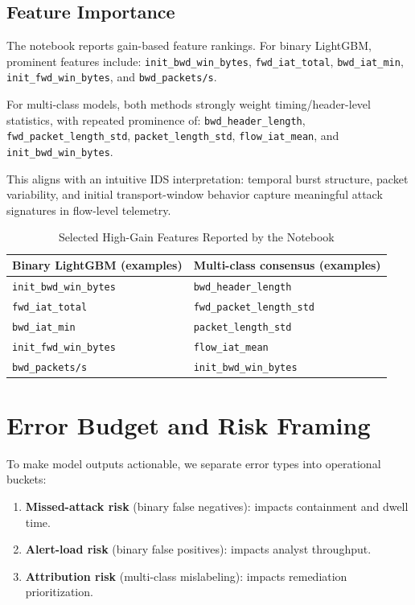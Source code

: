 \documentclass[10pt,journal]{IEEEtran}
\begin{document}
\subsection{Feature Importance}
The notebook reports gain-based feature rankings. For binary LightGBM, prominent features include:
\texttt{init\_bwd\_win\_bytes}, \texttt{fwd\_iat\_total}, \texttt{bwd\_iat\_min}, \texttt{init\_fwd\_win\_bytes}, and \texttt{bwd\_packets/s}. 

For multi-class models, both methods strongly weight timing/header-level statistics, with repeated prominence of:
\texttt{bwd\_header\_length}, \texttt{fwd\_packet\_length\_std}, \texttt{packet\_length\_std}, \texttt{flow\_iat\_mean}, and \texttt{init\_bwd\_win\_bytes}.

This aligns with an intuitive IDS interpretation: temporal burst structure, packet variability, and initial transport-window behavior capture meaningful attack signatures in flow-level telemetry.

\begin{table}[!t]
\caption{Selected High-Gain Features Reported by the Notebook}
\label{tab:feature_top}
\centering
\begin{tabular}{l l}
\toprule
Binary LightGBM (examples) & Multi-class consensus (examples) \\
\midrule
\texttt{init\_bwd\_win\_bytes} & \texttt{bwd\_header\_length} \\
\texttt{fwd\_iat\_total} & \texttt{fwd\_packet\_length\_std} \\
\texttt{bwd\_iat\_min} & \texttt{packet\_length\_std} \\
\texttt{init\_fwd\_win\_bytes} & \texttt{flow\_iat\_mean} \\
\texttt{bwd\_packets/s} & \texttt{init\_bwd\_win\_bytes} \\
\bottomrule
\end{tabular}
\end{table}

\section{Error Budget and Risk Framing}
To make model outputs actionable, we separate error types into operational buckets:
\begin{enumerate}
\item \textbf{Missed-attack risk} (binary false negatives): impacts containment and dwell time.
\item \textbf{Alert-load risk} (binary false positives): impacts analyst throughput.
\item \textbf{Attribution risk} (multi-class mislabeling): impacts remediation prioritization.
\end{enumerate}
\end{document}
